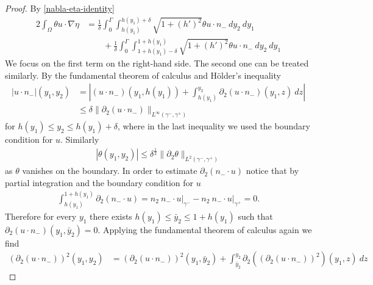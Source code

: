\documentclass{article}
\theoremstyle{definition}
\theoremstyle{definition}
\begin{document}
\begin{proof}
By \eqref{nabla-eta-identity}
\begin{equation}
    \label{theta-u-grad-eta-estimate-1}
    \begin{aligned}
        2\int_\Omega \theta u\cdot\nabla \eta &= \frac{1}{\delta} \int_0^\Gamma \int_{h(y_1)}^{h(y_1)+\delta} \sqrt{1+(h')^2} \theta u\cdot n_-\ dy_2\ dy_1
        \\
        &\qquad + \frac{1}{\delta} \int_0^\Gamma\int_{1+h(y_1)-\delta}^{1+h(y_1)} \sqrt{1+(h')^2} \theta u\cdot n_-\ dy_2 \ dy_1
    \end{aligned}
\end{equation}
We focus on the first term on the right-hand side. The second one can be treated similarly. By the fundamental theorem of calculus and Hölder's inequality
\begin{equation}
    \label{theta-u-grad-eta-estimate-u}
    \begin{aligned}
        |u\cdot n_-|(y_1,y_2)&=\left|(u\cdot n_-)(y_1,h(y_1))+ \int_{h(y_1)}^{y_2} \partial_2(u\cdot n_-)(y_1,z) \ dz\right| 
        \\
        &\leq \delta \|\partial_2(u\cdot n_-)\|_{L^\infty(\gamma^-,\gamma^+)}
    \end{aligned}
\end{equation}
for $h(y_1)\leq y_2\leq h(y_1)+\delta$, where in the last inequality we used the boundary condition for $u$. Similarly
\begin{align}
    \label{theta-u-grad-eta-estimate-theta}
    |\theta(y_1,y_2)|\leq \delta^\frac{1}{2}\|\partial_2 \theta\|_ {L^2(\gamma^-,\gamma^+)}
\end{align}
as $\theta$ vanishes on the boundary. In order to estimate $\partial_2 (n_-\cdot u)$ notice that by partial integration and the boundary condition for $u$
\begin{align*}
    \int_{h(y_1)}^{1+h(y_1)} \partial_2 (n_- \cdot u) = n_2 \ n_-\cdot u\vert_{\gamma^-} - n_2 \ n_-\cdot u\vert_{\gamma^+} = 0.
\end{align*}
Therefore for every $y_1$ there exists $h(y_1)\leq \bar y_2\leq 1+h(y_1)$ such that $\partial_2(u\cdot n_-)(y_1,\bar y_2)=0$. Applying the fundamental theorem of calculus again we find
\begin{equation}
    \label{theta-u-grad-eta-estimate-d22u}
    \begin{aligned}
        (\partial_2 (u\cdot n_-))^2(y_1,y_2)&= (\partial_2 (u\cdot n_-))^2 (y_1,\bar y_2) + \int_{\bar y_2}^{y_2} \partial_2 \left((\partial_2(u\cdot n_-))^2\right)(y_1,z)\ dz

\end{aligned}
\end{equation}
\end{proof}
\end{document}
